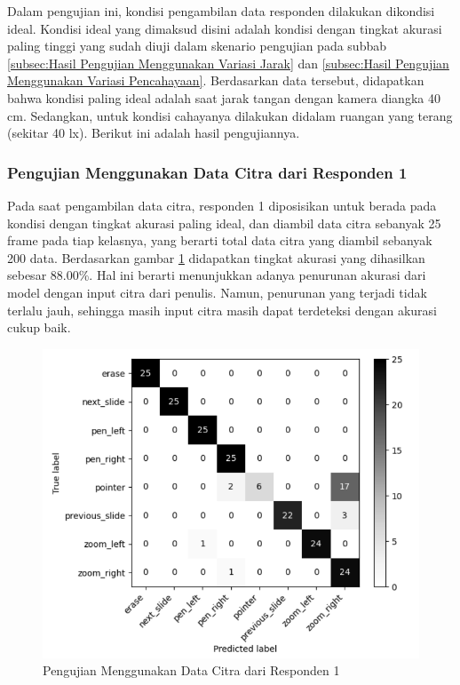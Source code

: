 Dalam pengujian ini, kondisi pengambilan data responden dilakukan dikondisi ideal. Kondisi ideal yang dimaksud disini adalah kondisi dengan tingkat akurasi paling tinggi yang sudah diuji dalam skenario pengujian pada subbab \ref{subsec:Hasil Pengujian Menggunakan Variasi Jarak} dan \ref{subsec:Hasil Pengujian Menggunakan Variasi Pencahayaan}. Berdasarkan data tersebut, didapatkan bahwa kondisi paling ideal adalah saat jarak tangan dengan kamera diangka 40 cm. Sedangkan, untuk kondisi cahayanya dilakukan didalam ruangan yang terang (sekitar 40 lx). Berikut ini adalah hasil pengujiannya.

\subsubsection{Pengujian Menggunakan Data Citra dari Responden 1}
\label{subsec:Pengujian Menggunakan Data Citra dari Responden 1}

Pada saat pengambilan data citra, responden 1 diposisikan untuk berada pada kondisi dengan tingkat akurasi paling ideal, dan diambil data citra sebanyak 25 frame pada tiap kelasnya, yang berarti total data citra yang diambil sebanyak 200 data. Berdasarkan gambar \ref{fig:Pengujian Menggunakan Data Citra dari Responden 1} didapatkan tingkat akurasi yang dihasilkan sebesar 88.00\%. Hal ini berarti menunjukkan adanya penurunan akurasi dari model dengan input citra dari penulis. Namun, penurunan yang terjadi tidak terlalu jauh, sehingga masih input citra masih dapat terdeteksi dengan akurasi cukup baik. 

\begin{figure}[!htb]
  \centering
  \includegraphics[scale=0.5]{gambar/pengujian-ukuran-tangan/tangan-alfan.png}
  \caption{Pengujian Menggunakan Data Citra dari Responden 1}
  \label{fig:Pengujian Menggunakan Data Citra dari Responden 1}
\end{figure}

